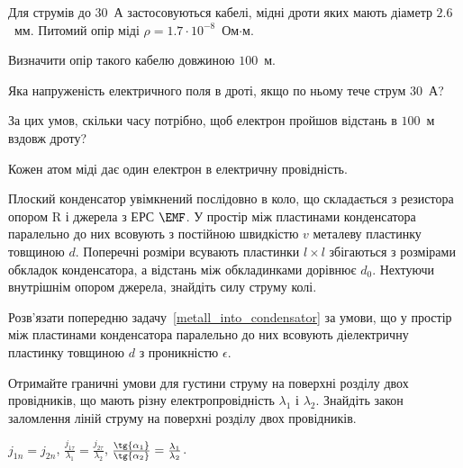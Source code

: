 \begin{problem}
    Для струмів до $30$~А застосовуються кабелі, мідні дроти яких мають діаметр $2.6$~мм. Питомий опір міді $\rho = 1.7\cdot 10^{-8}$~Ом$\cdot$м.
	\begin{enumerate*}[label=\alph*)]
		\item Визначити опір такого кабелю довжиною $100$~м.
		\item Яка напруженість електричного поля в дроті, якщо по ньому тече струм $30$~А?
		\item За цих умов, скільки часу потрібно, щоб електрон пройшов відстань в $100$~м вздовж дроту?
	\end{enumerate*}
  Кожен атом міді дає один електрон в електричну провідність.
\end{problem}

\begin{problem}\label{metall_into_condensator}
    Плоский конденсатор увімкнений послідовно в коло, що складається з резистора опором R і джерела з ЕРС $\EMF$. У простір між пластинами конденсатора паралельно до них всовують з постійною швидкістю $v$ металеву пластинку товщиною $d$. Поперечні розміри всувають пластинки $l \times l$ збігаються з розмірами обкладок конденсатора, а відстань між обкладинками дорівнює $d_0$. Нехтуючи внутрішнім опором джерела, знайдіть силу струму колі.
\end{problem}

\begin{problem}\label{dielectric_into_condensator}
    Розв'язати попередню задачу~\ref{metall_into_condensator} за умови, що у простір між пластинами конденсатора паралельно до них всовують діелектричну пластинку товщиною $d$ з проникністю $\epsilon$.
\end{problem}

\begin{problem}
Отримайте граничні умови для густини струму на поверхні розділу двох провідників, що мають різну електропровідність $\lambda_1$ і $\lambda_2$. Знайдіть закон заломлення ліній струму на поверхні розділу двох провідників.
\begin{solution}
	$j_{1n} = j_{2n}$, $\frac{j_{1\tau}}{\lambda_1} = \frac{j_{2\tau}}{\lambda_2}$,
	$\frac{\tg{\alpha_1}}{\tg{\alpha_2}} = \frac{\lambda_1}{\lambda_2}$.
\end{solution}
\end{problem}

